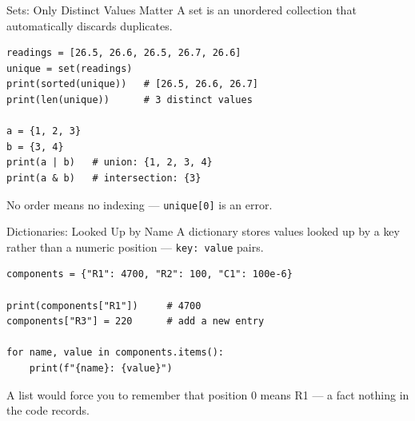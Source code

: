 \documentclass[9pt,aspectratio=169,xcolor=table]{beamer}
\begin{document}
\begin{frame}[fragile]{Sets: Only Distinct Values Matter}
    \leavevmode
    A \alert{set} is an unordered collection that automatically discards
    duplicates.

\begin{lstlisting}
readings = [26.5, 26.6, 26.5, 26.7, 26.6]
unique = set(readings)
print(sorted(unique))   # [26.5, 26.6, 26.7]
print(len(unique))      # 3 distinct values

a = {1, 2, 3}
b = {3, 4}
print(a | b)   # union: {1, 2, 3, 4}
print(a & b)   # intersection: {3}
\end{lstlisting}

    \vspace{1mm}
    {\small No order means no indexing --- \texttt{unique[0]} is an
    error.}
\end{frame}

\begin{frame}[fragile]{Dictionaries: Looked Up by Name}
    \leavevmode
    A \alert{dictionary} stores values looked up by a \alert{key} rather
    than a numeric position --- \texttt{key: value} pairs.

\begin{lstlisting}
components = {"R1": 4700, "R2": 100, "C1": 100e-6}

print(components["R1"])     # 4700
components["R3"] = 220      # add a new entry

for name, value in components.items():
    print(f"{name}: {value}")
\end{lstlisting}

    \vspace{1mm}
    {\small A list would force you to remember that position 0 means
    R1 --- a fact nothing in the code records.}
\end{frame}
\end{document}
